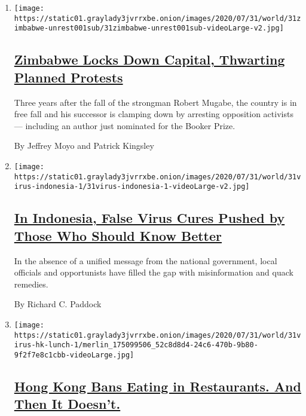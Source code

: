 \begin{enumerate}
\def\labelenumi{\arabic{enumi}.}
\item
  \texttt{[image: https://static01.graylady3jvrrxbe.onion/images/2020/07/31/world/31zimbabwe-unrest001sub/31zimbabwe-unrest001sub-videoLarge-v2.jpg]}

  \hypertarget{zimbabwe-locks-down-capital-thwarting-planned-protests}{%
  \subsection{\texorpdfstring{\href{/2020/07/31/world/africa/zimbabwe-coronavirus-protest.html}{Zimbabwe
  Locks Down Capital, Thwarting Planned
  Protests}}{Zimbabwe Locks Down Capital, Thwarting Planned Protests}}\label{zimbabwe-locks-down-capital-thwarting-planned-protests}}

  Three years after the fall of the strongman Robert Mugabe, the country
  is in free fall and his successor is clamping down by arresting
  opposition activists --- including an author just nominated for the
  Booker Prize.

  By Jeffrey Moyo and Patrick Kingsley
\item
  \texttt{[image: https://static01.graylady3jvrrxbe.onion/images/2020/07/31/world/31virus-indonesia-1/31virus-indonesia-1-videoLarge-v2.jpg]}

  \hypertarget{in-indonesia-false-virus-cures-pushed-by-those-who-should-know-better}{%
  \subsection{\texorpdfstring{\href{/2020/07/31/world/asia/indonesia-coronavirus.html}{In
  Indonesia, False Virus Cures Pushed by Those Who Should Know
  Better}}{In Indonesia, False Virus Cures Pushed by Those Who Should Know Better}}\label{in-indonesia-false-virus-cures-pushed-by-those-who-should-know-better}}

  In the absence of a unified message from the national government,
  local officials and opportunists have filled the gap with
  misinformation and quack remedies.

  By Richard C. Paddock
\item
  \texttt{[image: https://static01.graylady3jvrrxbe.onion/images/2020/07/31/world/31virus-hk-lunch-1/merlin\_175099506\_52c8d8d4-24c6-470b-9b80-9f2f7e8c1cbb-videoLarge.jpg]}

  \hypertarget{hong-kong-bans-eating-in-restaurants-and-then-it-doesnt}{%
  \subsection{\texorpdfstring{\href{/2020/07/31/world/asia/hongkong-dining-lunch-coronavirus.html}{Hong
  Kong Bans Eating in Restaurants. And Then It
  Doesn't.}}{Hong Kong Bans Eating in Restaurants. And Then It Doesn't.}}\label{hong-kong-bans-eating-in-restaurants-and-then-it-doesnt}}


\end{enumerate}
